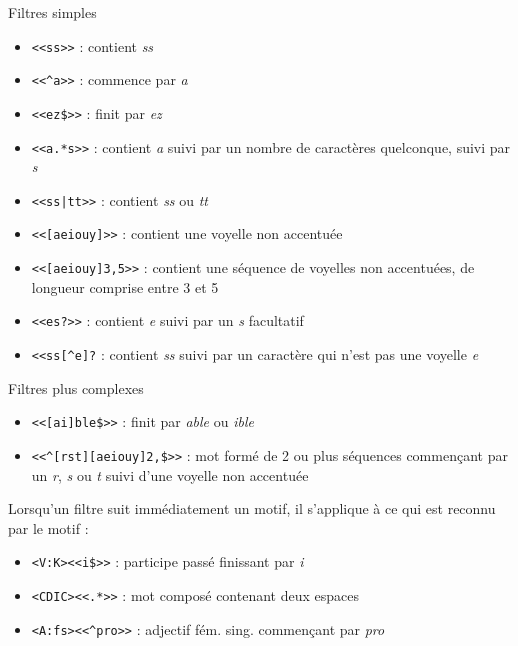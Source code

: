 \documentclass[xetex,xcolor={table,usenames,dvipsnames}]{beamer}
\begin{document}
\begin{frame}{Filtres simples}
	\begin{itemize}
		\item \texttt{<<ss>>} : contient \textit{ss}
		\item \texttt{<<\^{}a>>} : commence par \textit{a}
		\item \texttt{<<ez\${}>>} : finit par \textit{ez}
		\item \texttt{<<a.*s>>} : contient \textit{a} suivi par un nombre de caractères quelconque, suivi par \textit{s}
		\item \texttt{<<ss|tt>>} : contient \textit{ss} ou \textit{tt}
		\item \texttt{<<[aeiouy]>>} : contient une voyelle non accentuée
		\item \texttt{<<[aeiouy]3,5>>} : contient une séquence de voyelles non accentuées, de longueur comprise entre 3 et 5
		\item \texttt{<<es?>>} : contient \textit{e} suivi par un \textit{s} facultatif
		\item \texttt{<<ss[\^{}e]?} : contient \textit{ss} suivi par un caractère qui n'est pas une voyelle \textit{e}
	\end{itemize}
\end{frame}

\begin{frame}{Filtres plus complexes}
	\begin{itemize}
		\item \texttt{<<[ai]ble\${}>>} : finit par \textit{able} ou \textit{ible}
		\item \texttt{<<\^{}[rst][aeiouy]{2,}\${}>>} : mot formé de 2 ou plus séquences commençant par un \textit{r}, \textit{s} ou \textit{t} suivi d'une voyelle non accentuée
	\end{itemize}
	
	Lorsqu'un filtre suit immédiatement un motif, il s'applique à ce qui est reconnu par le motif :
	\begin{itemize}
		\item \texttt{<V:K><<i\${}>>} : participe passé finissant par \textit{i}
		\item \texttt{<CDIC><<.*>>} : mot composé contenant deux espaces
		\item \texttt{<A:fs><<\^{}pro>>} : adjectif fém. sing. commençant par \textit{pro}
	\end{itemize}
\end{frame}
\end{document}
